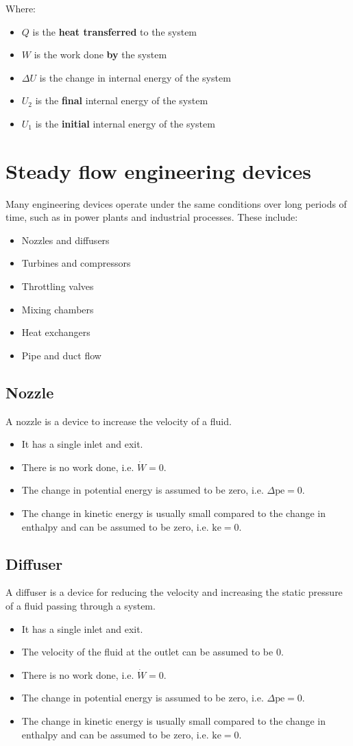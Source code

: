 \documentclass[11pt]{article}
\begin{document}
Where:
\begin{itemize}
\item \(Q\) is the \textbf{heat transferred} to the system
\item \(W\) is the work done \textbf{by} the system
\item \(\Delta U\) is the change in internal energy of the system
\item \(U_2\) is the \textbf{final} internal energy of the system
\item \(U_1\) is the \textbf{initial} internal energy of the system
\end{itemize}
\section{Steady flow engineering devices}
\label{sec:orge354297}
Many engineering devices operate under the same conditions over long periods of time, such as in power plants and industrial processes. These include:
\begin{itemize}
\item Nozzles and diffusers
\item Turbines and compressors
\item Throttling valves
\item Mixing chambers
\item Heat exchangers
\item Pipe and duct flow
\end{itemize}
\subsection{Nozzle}
\label{sec:orga963269}
A nozzle is a device to increase the velocity of a fluid.
\begin{itemize}
\item It has a single inlet and exit.
\item There is no work done, i.e. \(\dot{W} = 0\).
\item The change in potential energy is assumed to be zero, i.e. \(\Delta \text{pe} = 0\).
\item The change in kinetic energy is usually small compared to the change in enthalpy and can be assumed to be zero, i.e. \(\text{ke} = 0\).
\end{itemize}
\subsection{Diffuser}
\label{sec:org3e6e85d}
A diffuser is a device for reducing the velocity and increasing the static pressure of a fluid passing through a system.
\begin{itemize}
\item It has a single inlet and exit.
\item The velocity of the fluid at the outlet can be assumed to be \(0\).
\item There is no work done, i.e. \(\dot{W} = 0\).
\item The change in potential energy is assumed to be zero, i.e. \(\Delta \text{pe} = 0\).
\item The change in kinetic energy is usually small compared to the change in enthalpy and can be assumed to be zero, i.e. \(\text{ke} = 0\).
\end{itemize}
\end{document}
